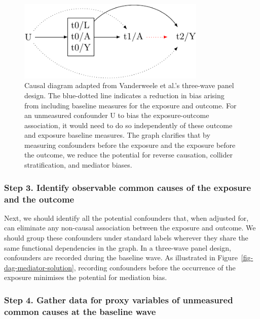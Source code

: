 \documentclass[
  singlecolumn]{article}
\begin{document}
\begin{figure}

{\centering \includegraphics[width=0.8\textwidth,height=\textheight]{causal-dags_files/figure-pdf/fig-dag-6-1.pdf}

}

\caption{\label{fig-dag-6}Causal diagram adapted from Vanderweele et
al.'s three-wave panel design. The blue-dotted line indicates a
reduction in bias arising from including baseline measures for the
exposure and outcome. For an unmeasured confounder U to bias the
exposure-outcome association, it would need to do so independently of
these outcome and exposure baseline measures. The graph clarifies that
by measuring confounders before the exposure and the exposure before the
outcome, we reduce the potential for reverse causation, collider
stratification, and mediator biases.}

\end{figure}

\hypertarget{step-3.-identify-observable-common-causes-of-the-exposure-and-the-outcome}{%
\subsubsection{Step 3. Identify observable common causes of the exposure
and the
outcome}\label{step-3.-identify-observable-common-causes-of-the-exposure-and-the-outcome}}

Next, we should identify all the potential confounders that, when
adjusted for, can eliminate any non-causal association between the
exposure and outcome. We should group these confounders under standard
labels wherever they share the same functional dependencies in the
graph. In a three-wave panel design, confounders are recorded during the
baseline wave. As illustrated in Figure~\ref{fig-dag-mediator-solution},
recording confounders before the occurrence of the exposure minimises
the potential for mediation bias.

\hypertarget{step-4.-gather-data-for-proxy-variables-of-unmeasured-common-causes-at-the-baseline-wave}{%
\subsubsection{Step 4. Gather data for proxy variables of unmeasured
common causes at the baseline
wave}\label{step-4.-gather-data-for-proxy-variables-of-unmeasured-common-causes-at-the-baseline-wave}}
\end{document}
